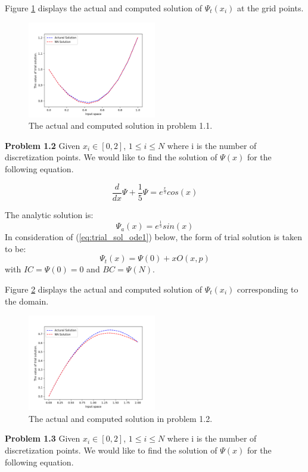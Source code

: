 \documentclass{article}
\begin{document}
\medskip \noindent
Figure \ref{fig:trial_ode1} displays the actual and computed solution of $\Psi_{t}(x_i)$ at the grid points.
\begin{figure}
	\centering
	\includegraphics[width=0.5\textwidth]{ode_1.png}
	\caption{The actual and computed solution in problem 1.1. }
	\label{fig:trial_ode1}
\end{figure}

\medskip \noindent
\textbf{Problem 1.2} Given $x_i \in [0,2]$, $1 \leq i \leq N$ where i is the number of discretization points. We would like to find the solution of $\Psi(x)$ for the following equation.   

\[\frac{d}{dx} \Psi + \frac{1}{5} \Psi = e^{\frac{x}{5}}cos(x)\]

\medskip \noindent
The analytic solution is:
\[\Psi_{a}(x) = e^{\frac{1}{5}}sin(x) \]
In consideration of (\ref{eq:trial_sol_ode1}) below, the form of trial solution is taken to be: 
\[\Psi_t(x) = \Psi(0) + xO(x,p)\] with $IC = \Psi(0)=0$ and $BC =\Psi(N)$.

\medspace \noindent
Figure \ref{fig:trial_ode2} displays the actual and computed solution of $\Psi _t(x_i)$ corresponding to the domain. 

\begin{figure}
	\centering
	\includegraphics[width=0.5\textwidth]{ode_2.png}
	\caption{The actual and computed solution in problem 1.2. }
	\label{fig:trial_ode2}
\end{figure}

\medskip \noindent
\textbf{Problem 1.3} Given $x_i \in [0,2]$, $1 \leq i \leq N$ where i is the number of discretization points. We would like to find the solution of $\Psi(x)$ for the following equation.
\end{document}
